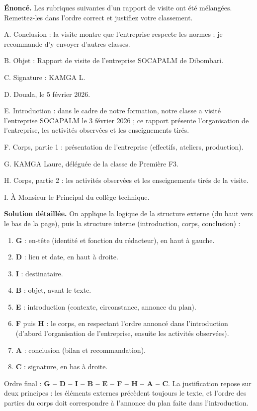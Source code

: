 \documentclass[11pt]{article}
\begin{document}
\begin{exoresolu}
\textbf{Énoncé.} Les rubriques suivantes d'un rapport de visite ont été mélangées. Remettez-les dans l'ordre correct et justifiez votre classement.

A. Conclusion : la visite montre que l'entreprise respecte les normes ; je recommande d'y envoyer d'autres classes.

B. Objet : Rapport de visite de l'entreprise SOCAPALM de Dibombari.

C. Signature : KAMGA L.

D. Douala, le 5 février 2026.

E. Introduction : dans le cadre de notre formation, notre classe a visité l'entreprise SOCAPALM le 3 février 2026 ; ce rapport présente l'organisation de l'entreprise, les activités observées et les enseignements tirés.

F. Corps, partie 1 : présentation de l'entreprise (effectifs, ateliers, production).

G. KAMGA Laure, déléguée de la classe de Première F3.

H. Corps, partie 2 : les activités observées et les enseignements tirés de la visite.

I. À Monsieur le Principal du collège technique.

\tcblower
\textbf{Solution détaillée.} On applique la logique de la structure externe (du haut vers le bas de la page), puis la structure interne (introduction, corps, conclusion) :

\begin{enumerate}
\item \textbf{G} : en-tête (identité et fonction du rédacteur), en haut à gauche.
\item \textbf{D} : lieu et date, en haut à droite.
\item \textbf{I} : destinataire.
\item \textbf{B} : objet, avant le texte.
\item \textbf{E} : introduction (contexte, circonstance, annonce du plan).
\item \textbf{F} puis \textbf{H} : le corps, en respectant l'ordre annoncé dans l'introduction (d'abord l'organisation de l'entreprise, ensuite les activités observées).
\item \textbf{A} : conclusion (bilan et recommandation).
\item \textbf{C} : signature, en bas à droite.
\end{enumerate}

Ordre final : \textbf{G -- D -- I -- B -- E -- F -- H -- A -- C}. La justification repose sur deux principes : les éléments externes précèdent toujours le texte, et l'ordre des parties du corps doit correspondre à l'annonce du plan faite dans l'introduction.
\end{exoresolu}
\end{document}
